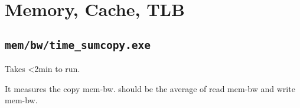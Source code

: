 \documentclass[main]{subfiles}
\begin{document}
\section{Memory, Cache, TLB}
\subsection{\texttt{mem/bw/time\_sumcopy.exe}}

Takes <2min to run.

It measures the copy mem-bw. should be the average of read mem-bw and write 
mem-bw.









\end{document}
